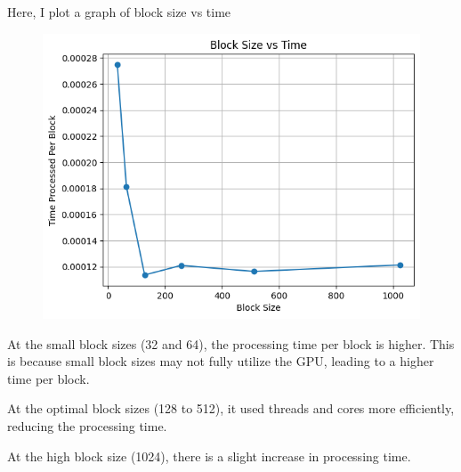 \documentclass{article}
\begin{document}
Here, I plot a graph of block size vs time
\begin{figure}[h]
    \centering
    \includegraphics[width=0.8\linewidth]{blocksize.png}
\end{figure}

At the small block sizes (32 and 64), the processing time per block is higher. This is because small block sizes may not fully utilize the GPU, leading to a higher time per block.

At the optimal block sizes (128 to 512), it used threads and cores more efficiently, reducing the processing time.

At the high block size (1024), there is a slight increase in processing time.
\end{document}
